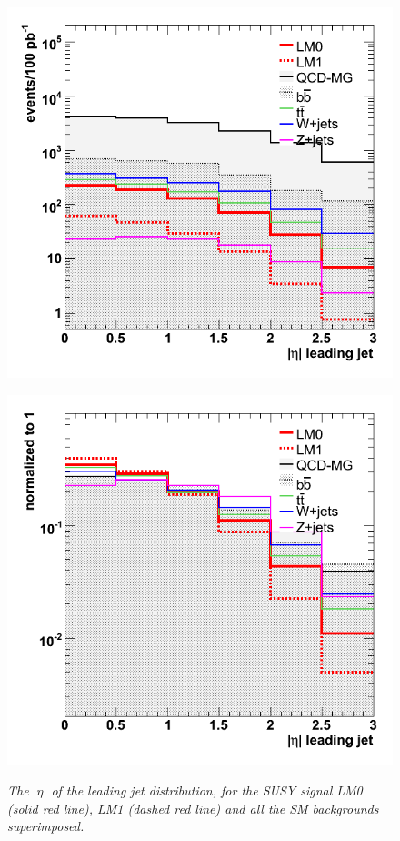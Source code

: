 \begin{figure}[h!]
\begin{minipage}[b]{0.5\linewidth}
\centering
{\label{fig:m$H_{T}$ov$H_{T}$}\includegraphics[scale=0.38]{./plots/JetEta.png}} 
\end{minipage}
\begin{minipage}[b]{0.5\linewidth}
\centering
{\label{fig:$H_{T}$}\includegraphics[scale=0.38]{./plots/JetEtaNorm.png}} 
\end{minipage}
\caption{\textit{The $|\eta|$ of the leading jet distribution, for the SUSY signal LM0 (solid red line), LM1 (dashed red line) and all the SM backgrounds superimposed.} }
\label{fig:jeteta}
\end{figure}


